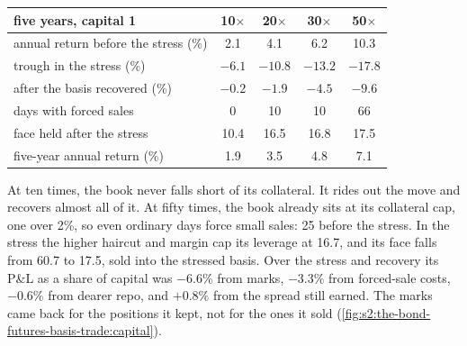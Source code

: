 \begin{center}
\small
\begin{tabular}{@{}lcccc@{}}
\toprule
five years, capital 1 & 10$\times$ & 20$\times$ & 30$\times$ & 50$\times$\\
\midrule
annual return before the stress (\%) & 2.1 & 4.1 & 6.2 & 10.3\\
trough in the stress (\%) & $-6.1$ & $-10.8$ & $-13.2$ & $-17.8$\\
after the basis recovered (\%) & $-0.2$ & $-1.9$ & $-4.5$ & $-9.6$\\
days with forced sales & 0 & 10 & 10 & 66\\
face held after the stress & 10.4 & 16.5 & 16.8 & 17.5\\
five-year annual return (\%) & 1.9 & 3.5 & 4.8 & 7.1\\
\bottomrule
\end{tabular}
\end{center}

At ten times, the book never falls short of its collateral. It rides out the move and recovers almost all of it. At fifty times, the book already sits at
its collateral cap, one over 2\%, so even ordinary days force small sales: 25 before the stress. In the stress the higher haircut and margin cap its
leverage at 16.7, and its face falls from 60.7 to 17.5, sold into the stressed basis. Over the stress and recovery its P\&L as a share of capital was $-6.6\%$ from marks, $-3.3\%$ from forced-sale costs, $-0.6\%$ from
dearer repo, and $+0.8\%$ from the spread still earned. The marks came back for the positions it kept, not for the ones it sold
(\cref{fig:s2:the-bond-futures-basis-trade:capital}).

\begin{omfigure}

\label{fig:s2:the-bond-futures-basis-trade:capital}
\end{omfigure}

